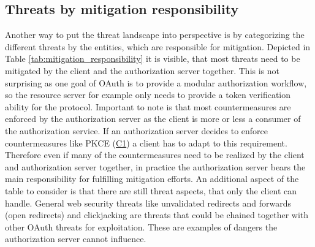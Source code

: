 \subsection{Threats by mitigation responsibility}
Another way to put the threat landscape into perspective is by categorizing the different threats by the entities, which are responsible for mitigation. Depicted in Table \ref{tab:mitigation_responsibility} it is visible, that most threats need to be mitigated by the client and the authorization server together. This is not surprising as one goal of OAuth is to provide a modular authorization workflow, so the resource server for example only needs to provide a token verification ability for the protocol. Important to note is that most countermeasures are enforced by the authorization server as the client is more or less a consumer of the authorization service. If an authorization server decides to enforce countermeasures like PKCE (\hyperref[counter:C1]{C1}) a client has to adapt to this requirement. Therefore even if many of the countermeasures need to be realized by the client and authorization server together, in practice the authorization server bears the main responsibility for fulfilling mitigation efforts. An additional aspect of the table to consider is that there are still threat aspects, that only the client can handle. General web security threats like unvalidated redirects and forwards (open redirects) and clickjacking are threats that could be chained together with other OAuth threats for exploitation. These are examples of dangers the authorization server cannot influence.

